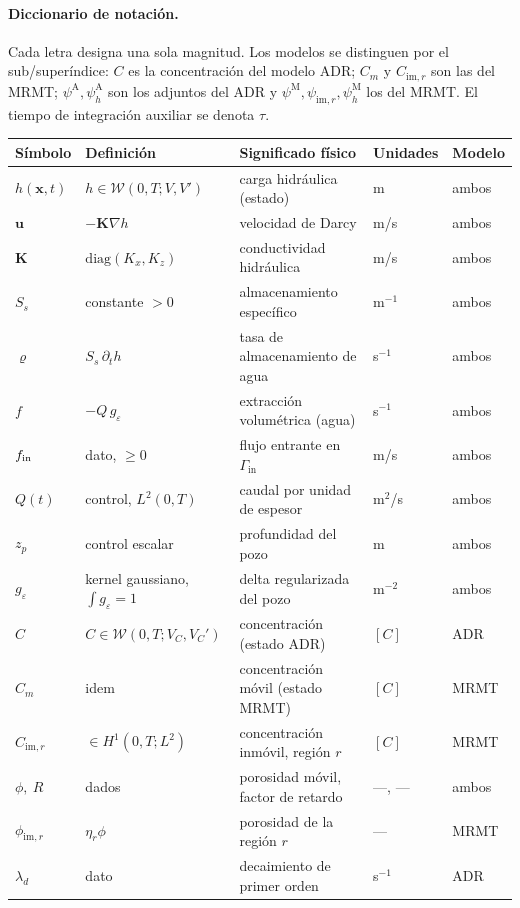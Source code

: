 \documentclass[11pt]{article}
\numberwithin{equation}{section}
\theoremstyle{remark}
\newcommand{\bu}{\mathbf{u}}
\newcommand{\bK}{\mathbf{K}}
\newcommand{\bx}{\mathbf{x}}
\newcommand{\geps}{g_\varepsilon}
\newcommand{\im}{\mathrm{im}}
\newcommand{\vr}{\varrho}              %
\newcommand{\pA}{\psi^{\mathrm{A}}}    %
\newcommand{\pM}{\psi^{\mathrm{M}}}    %
\newcommand{\pim}{\psi_{\im,r}}          %
\newcommand{\ph}[1]{\psi_h^{\mathrm{#1}}}  %
\newcommand{\Gin}{\Gamma_{\mathrm{in}}}
\begin{document}
\paragraph{Diccionario de notaci\'on.} Cada letra designa una sola magnitud. Los
modelos se distinguen por el sub/superíndice: $C$ es la concentraci\'on del modelo ADR;
$C_m$ y $C_{\im,r}$ son las del MRMT; $\pA,\ph{A}$ son los adjuntos del ADR y
$\pM,\pim,\ph{M}$ los del MRMT. El tiempo de integraci\'on auxiliar se denota $\tau$.

{\small
\begin{longtable}{@{}p{1.9cm}p{4.6cm}p{4.2cm}p{1.9cm}p{1.2cm}@{}}
\toprule
\textbf{S\'imbolo} & \textbf{Definici\'on} & \textbf{Significado f\'isico} & \textbf{Unidades} & \textbf{Modelo}\\
\midrule
\endhead
$h(\bx,t)$ & $h\in\mathcal{W}(0,T;V,V')$ & carga hidr\'aulica (estado) & m & ambos\\
$\bu$ & $-\bK\nabla h$ & velocidad de Darcy & m/s & ambos\\
$\bK$ & $\mathrm{diag}(K_x,K_z)$ & conductividad hidr\'aulica & m/s & ambos\\
$S_s$ & constante $>0$ & almacenamiento espec\'ifico & m$^{-1}$ & ambos\\
$\vr$ & $S_s\,\partial_th$ & tasa de almacenamiento de agua & s$^{-1}$ & ambos\\
$f$ & $-Q\,\geps$ & extracci\'on volum\'etrica (agua) & s$^{-1}$ & ambos\\
$f_{\rm in}$ & dato, $\ge0$ & flujo entrante en $\Gin$ & m/s & ambos\\
$Q(t)$ & control, $L^2(0,T)$ & caudal por unidad de espesor & m$^2$/s & ambos\\
$z_p$ & control escalar & profundidad del pozo & m & ambos\\
$\geps$ & kernel gaussiano, $\int\geps=1$ & delta regularizada del pozo & m$^{-2}$ & ambos\\
$C$ & $C\in\mathcal{W}(0,T;V_C,V_C')$ & concentraci\'on (estado ADR) & $[C]$ & ADR\\
$C_m$ & idem & concentraci\'on m\'ovil (estado MRMT) & $[C]$ & MRMT\\
$C_{\im,r}$ & $\in H^1(0,T;L^2)$ & concentraci\'on inm\'ovil, regi\'on $r$ & $[C]$ & MRMT\\
$\phi,\ R$ & dados & porosidad m\'ovil, factor de retardo & ---, --- & ambos\\
$\phi_{\im,r}$ & $\eta_r\phi$ & porosidad de la regi\'on $r$ & --- & MRMT\\
$\lambda_d$ & dato & decaimiento de primer orden & s$^{-1}$ & ADR\\

\end{longtable}}
\end{document}
